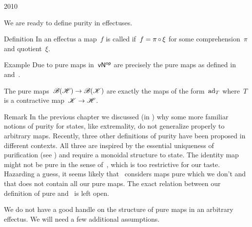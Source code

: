 \begin{parsec}{2010}%
\begin{point}{10}%
We are ready to define purity in effectuses.
\end{point}
\begin{point}{20}{Definition}%
In an effectus a map~$f$ is called 
    if~$f = \pi \mathop{\circ} \xi$
    for some comprehension~$\pi$
    and quotient~$\xi$.
\end{point}
\begin{point}{30}{Example}%
Due to 
    pure maps in~${\mathsf{vN}}{^{\mathsf{op}}}$
    are precisely the pure maps
    as defined in~
    and~.

The pure maps~$\mathscr{B}(\mathscr{H}) \to \mathscr{B}(\mathscr{K})$
    are exactly the maps of the form~$\mathrm{ad}_T$
    where~$T$ is a contractive map~$\mathscr{K} \to \mathscr{H}$.
\end{point}
\begin{point}{40}{Remark}%
In the previous chapter
    we discussed (in )
    why some more familiar notions of purity for states,
    like extremality,
    do not generalize properly to arbitrary maps.
Recently, three other definitions of purity
        have been proposed in different contexts.
        \cite{cunningham2017purity,chiribella2014distinguishability,selby2017leaks}
All three are inspired by the essential uniqueness
    of purification (see )
    and require a monoidal structure to state.
The identity map might not be pure
    in the sense of~\cite{chiribella2014distinguishability},
    which is too restrictive for our taste.
Hazarding a guess,
    it seems likely
    that~\cite{cunningham2017purity} considers maps pure which we don't
     and that \cite{selby2017leaks} does not contain all our pure maps.
The exact relation between
 our definition of pure
    and~\cite{cunningham2017purity,selby2017leaks}
    is left open.
\end{point}
\begin{point}{50}%
We do not have a good handle on the structure of pure maps in
    an arbitrary effectus.  We will need a few additional assumptions.
\end{point}
\end{parsec}


